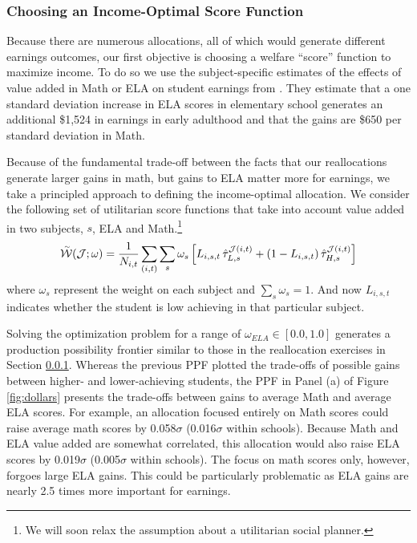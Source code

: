 \documentclass[12pt]{article}
\theoremstyle{definition}
\theoremstyle{definition}
\theoremstyle{definition}
\theoremstyle{definition}
\begin{document}
\subsubsection{Choosing an Income-Optimal Score Function}
Because there are numerous allocations, all of which would generate different earnings outcomes, our first objective is choosing a welfare ``score'' function to maximize income. To do so we use the subject-specific estimates of the effects of value added in Math or ELA on student earnings from \citet{chetty2014measuring1}. They estimate that a one standard deviation increase in ELA scores in elementary school generates an additional \$1,524 in earnings in early adulthood and that the gains are \$650 per standard deviation in Math. 

Because of the fundamental trade-off between the facts that our reallocations generate larger gains in math, but gains to ELA matter more for earnings, we take a principled approach to defining the income-optimal allocation. We consider the following set of utilitarian score functions that take into account value added in two subjects, $s$, ELA and Math.\footnote{We will soon relax the assumption about a utilitarian social planner.}
\begin{equation}
\accentset{\sim}{\mathcal{W}}(\mathcal{J};\omega) =  \frac{1}{N_{i,t}}\sum_{(i,t)} \sum_{s} \omega_s \left [ L_{i,s,t} \,\hat{\tau}^{\mathcal{J}(i,t)}_{L,s}  + (1-L_{i,s,t}) \, \hat{\tau}^{\mathcal{J}(i,t)}_{H,s} \right ]
\end{equation}
\noindent where $\omega_s$ represent the weight on each subject and $\sum_s \omega_s = 1$. And now $L_{i,s,t}$ indicates whether the student is low achieving in that particular subject.

Solving the optimization problem for a range of $\omega_{ELA}\in[0.0,1.0]$ generates a production possibility frontier similar to those in the reallocation exercises in Section \ref{}. Whereas the previous PPF plotted the trade-offs of possible gains between higher- and lower-achieving students, the PPF in Panel (a) of Figure \ref{fig:dollars} presents the trade-offs between gains to average Math and average ELA scores. For example, an allocation focused entirely on Math scores could raise average math scores by 0.058$\sigma$ (0.016$\sigma$ within schools).  Because Math and ELA value added are somewhat correlated, this allocation would also raise ELA scores by 0.019$\sigma$ (0.005$\sigma$ within schools). The focus on math scores only, however, forgoes large ELA gains. This could be particularly problematic as ELA gains are nearly 2.5 times more important for earnings.
\end{document}
